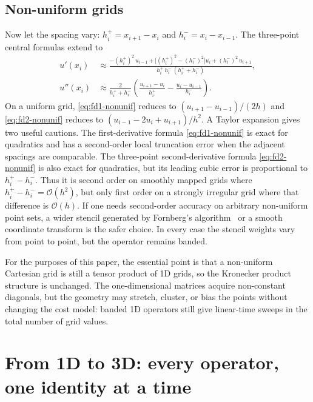 \documentclass[11pt]{article}
\newcommand{\bigO}{\mathcal{O}}
\begin{document}
\subsection{Non-uniform grids}
\label{sec:1d-nonuniform}

Now let the spacing vary: $h_i^{+} = x_{i+1} - x_i$ and
$h_i^{-} = x_i - x_{i-1}$.  The three-point central formulas extend
to
\begin{align}
  u'(x_i) &\approx
  \frac{
    -(h_i^{+})^2 \, u_{i-1}
    + \bigl[(h_i^{+})^2 - (h_i^{-})^2\bigr] u_i
    + (h_i^{-})^2 \, u_{i+1}
  }{
    h_i^{+}\, h_i^{-}\, (h_i^{+} + h_i^{-})
  },
  \label{eq:fd1-nonunif} \\[4pt]
  u''(x_i) &\approx
  \frac{2}{h_i^{+} + h_i^{-}}
  \left(
    \frac{u_{i+1} - u_i}{h_i^{+}} - \frac{u_i - u_{i-1}}{h_i^{-}}
  \right).
  \label{eq:fd2-nonunif}
\end{align}
On a uniform grid, \eqref{eq:fd1-nonunif} reduces to
$(u_{i+1} - u_{i-1})/(2h)$ and \eqref{eq:fd2-nonunif} reduces to
$(u_{i-1} - 2 u_i + u_{i+1})/h^2$.  A Taylor expansion gives two
useful cautions.  The first-derivative formula
\eqref{eq:fd1-nonunif} is exact for quadratics and has a second-order
local truncation error when the adjacent spacings are comparable.  The
three-point second-derivative formula \eqref{eq:fd2-nonunif} is also
exact for quadratics, but its leading cubic error is proportional to
$h_i^{+}-h_i^{-}$.  Thus it is second order on smoothly mapped grids
where $h_i^{+}-h_i^{-}=\bigO(h^2)$, but only first order on a
strongly irregular grid where that difference is $\bigO(h)$.  If one
needs second-order accuracy on arbitrary non-uniform point sets, a
wider stencil generated by Fornberg's algorithm~\citep{fornberg1988generation}
or a smooth coordinate transform is the safer choice.  In every case
the stencil weights vary from point to point, but the operator remains
banded.

For the purposes of this paper, the essential point is that a
non-uniform Cartesian grid is still a tensor product of 1D grids, so
the Kronecker product structure is unchanged.  The one-dimensional
matrices acquire non-constant diagonals, but the geometry may stretch,
cluster, or bias the points without changing the cost model: banded 1D
operators still give linear-time sweeps in the total number of grid
values.


\section{From 1D to 3D: every operator, one identity at a time}
\label{sec:3d-ops}
\end{document}
